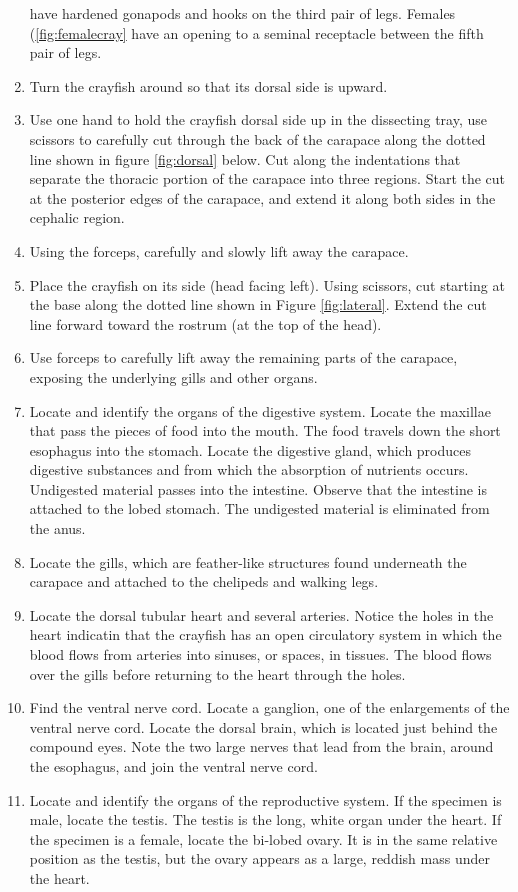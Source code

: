 \begin{enumerate}
  have hardened gonapods and hooks on the third pair of legs. Females
  (\ref{fig:femalecray} have an opening to a seminal receptacle between
  the fifth pair of legs.
\item
  Turn the crayfish around so that its dorsal side is upward.
\item
  Use one hand to hold the crayfish dorsal side up in the dissecting
  tray, use scissors to carefully cut through the back of the carapace
  along the dotted line shown in figure \ref{fig:dorsal} below. Cut
  along the indentations that separate the thoracic portion of the
  carapace into three regions. Start the cut at the posterior edges of
  the carapace, and extend it along both sides in the cephalic region.
\item
  Using the forceps, carefully and slowly lift away the carapace.
\item
  Place the crayfish on its side (head facing left). Using scissors, cut
  starting at the base along the dotted line shown in Figure
  \ref{fig:lateral}. Extend the cut line forward toward the rostrum (at
  the top of the head).
\item
  Use forceps to carefully lift away the remaining parts of the
  carapace, exposing the underlying gills and other organs.
\item
  Locate and identify the organs of the digestive system. Locate the
  maxillae that pass the pieces of food into the mouth. The food travels
  down the short esophagus into the stomach. Locate the digestive gland,
  which produces digestive substances and from which the absorption of
  nutrients occurs. Undigested material passes into the intestine.
  Observe that the intestine is attached to the lobed stomach. The
  undigested material is eliminated from the anus.
\item
  Locate the gills, which are feather-like structures found underneath
  the carapace and attached to the chelipeds and walking legs.
\item
  Locate the dorsal tubular heart and several arteries. Notice the holes
  in the heart indicatin that the crayfish has an open circulatory
  system in which the blood flows from arteries into sinuses, or spaces,
  in tissues. The blood flows over the gills before returning to the
  heart through the holes.
\item
  Find the ventral nerve cord. Locate a ganglion, one of the
  enlargements of the ventral nerve cord. Locate the dorsal brain, which
  is located just behind the compound eyes. Note the two large nerves
  that lead from the brain, around the esophagus, and join the ventral
  nerve cord.
\item
  Locate and identify the organs of the reproductive system. If the
  specimen is male, locate the testis. The testis is the long, white
  organ under the heart. If the specimen is a female, locate the
  bi-lobed ovary. It is in the same relative position as the testis, but
  the ovary appears as a large, reddish mass under the heart.
\end{enumerate}

